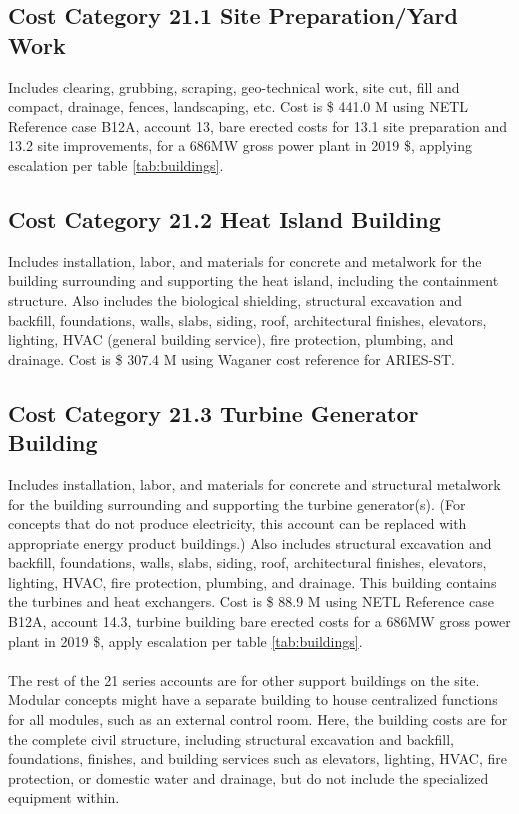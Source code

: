 \subsection*{Cost Category 21.1 Site Preparation/Yard Work}
Includes clearing, grubbing, scraping, geo-technical work, site cut, fill and compact, drainage, fences, landscaping, etc.  Cost is \$ 441.0 M using NETL Reference case B12A, account 13, bare erected costs for 13.1 site preparation and 13.2 site improvements, for a 686MW gross power plant in 2019 \$, applying escalation per table \ref{tab:buildings}.

\subsection*{Cost Category 21.2 Heat Island Building}
Includes installation, labor, and materials for concrete and metalwork for the building surrounding and supporting the heat island, including the containment structure. Also includes the biological shielding, structural excavation and backfill, foundations, walls, slabs, siding, roof, architectural finishes, elevators, lighting, HVAC (general building service), fire protection, plumbing, and drainage. Cost is \$ 307.4 M using Waganer cost reference for ARIES-ST.


\subsection*{Cost Category 21.3 Turbine Generator Building}
Includes installation, labor, and materials for concrete and structural metalwork for the building surrounding and supporting the turbine generator(s). (For concepts that do not produce electricity, this account can be replaced with appropriate energy product buildings.) Also includes structural excavation and backfill, foundations, walls, slabs, siding, roof, architectural finishes, elevators, lighting, HVAC, fire protection, plumbing, and drainage.  This building contains the turbines and heat exchangers. Cost is \$ 88.9 M using NETL Reference case B12A, account 14.3, turbine building bare erected costs for a 686MW gross power plant in 2019 \$, apply escalation per table \ref{tab:buildings}.

\paragraph{}
The rest of the 21 series accounts are for other support buildings on the site. Modular concepts might have a separate building to house centralized functions for all modules, such as an external control room. Here, the building costs are for the complete civil structure, including structural excavation and backfill, foundations, finishes, and building services such as elevators, lighting, HVAC, fire protection, or domestic water and drainage, but do not include the specialized equipment within.


